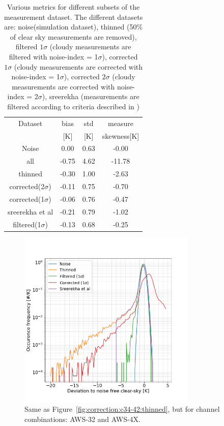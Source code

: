 \documentclass[12pt]{article}
\begin{document}
\begin{table}[!bt]
	\centering
	\begin{tabular}[b]{c|c|c|c}
		Dataset  		  &   bias &   std &   measure  \\
		&   [K]  &   [K] & skewness[K]\\
		\hline
		Noise            &   0.00 &  0.63 &              -0.00 \\
		all               &  -0.75 &  4.62 &             -11.78 \\
		thinned           &  -0.30 &  1.00 &              -2.63 \\
		corrected(2$\sigma$) &  -0.11 &  0.75 &              -0.70 \\
		corrected(1$\sigma$) &  -0.06 &  0.76 &              -0.47 \\
		sreerekha et al   &  -0.21 &  0.79 &              -1.02 \\
		filtered(1$\sigma$)   &  -0.13 &  0.68 &              -0.25 \\
		\hline
	\end{tabular}
	\caption{Various metrics for different subsets of the measurement dataset. The different datasets are: noise(simulation dataset), thinned (50\% of clear sky measurements are removed), filtered $1\sigma$ (cloudy measurements are filtered with noise-index = 1$\sigma$), corrected $1\sigma$ (cloudy measurements are corrected with noise-index = 1$\sigma$), corrected $2\sigma$ (cloudy measurements are corrected with noise-index = 2$\sigma$), sreerekha (measurements are filtered according to criteria described in \cite{rekha2012potential})   }
	\label{tab:correction:stats:34:42}
\end{table}

\begin{figure}[!tb]
	\centering
	\includegraphics[height=85mm]{PDF_corrected_AWS-32_AWS-4X_thinned}
	\caption{Same as Figure~\ref{fig:correction:c34-42:thinned}, but for channel combinations: AWS-32 and AWS-4X.}
	\label{fig:correction:c32-4X:thinned}
\end{figure}
\end{document}
